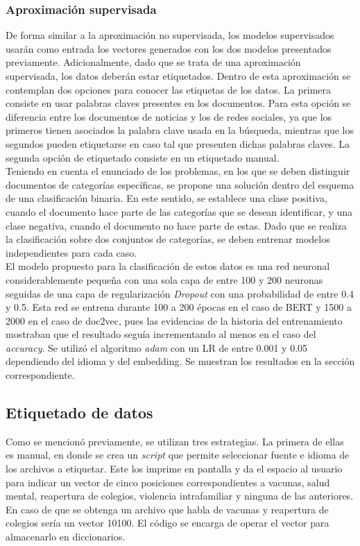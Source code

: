 \subsubsection{Aproximación supervisada}
De forma similar a la aproximación no supervisada, los modelos supervisados usarán como entrada los vectores generados con los dos modelos presentados previamente. Adicionalmente, dado que se trata de una aproximación supervisada, los datos deberán estar etiquetados. Dentro de esta aproximación se contemplan dos opciones para conocer las etiquetas de los datos. La primera consiste en usar palabras claves presentes en los documentos. Para esta opción se diferencia entre los documentos de noticias y los de redes sociales, ya que los primeros tienen asociados la palabra clave usada en la búsqueda, mientras que los segundos pueden etiquetarse en caso tal que presenten dichas palabras claves. La segunda opción de etiquetado consiste en un etiquetado manual.\\

Teniendo en cuenta el enunciado de los problemas, en los que se deben distinguir documentos de categorías específicas, se propone una solución dentro del esquema de una clasificación binaria. En este sentido, se establece una clase positiva, cuando el documento hace parte de las categorías que se desean identificar, y una clase negativa, cuando el documento no hace parte de estas. Dado que se realiza la clasificación sobre dos conjuntos de categorías, se deben entrenar modelos independientes para cada caso.\\

El modelo propuesto para la clasificación de estos datos es una red neuronal considerablemente pequeña con una sola capa de entre 100 y 200 neuronas seguidas de una capa de regularización \textit{Dropout} con una probabilidad de entre 0.4 y 0.5. Esta red se entrena durante 100 a 200 épocas en el caso de BERT y 1500 a 2000 en el caso de doc2vec, pues las evidencias de la historia del entrenamiento mostraban que el resultado seguía incrementando al menos en el caso del \textit{accuracy}. Se utilizó el algoritmo \textit{adam} con un LR de entre 0.001 y 0.05 dependiendo del idioma y del embedding. Se muestran los resultados en la sección correspondiente.

\subsection{Etiquetado de datos}
Como se mencionó previamente, se utilizan tres estrategias. La primera de ellas es manual, en donde se crea un \textit{script} que permite seleccionar fuente e idioma de los archivos a etiquetar. Este los imprime en pantalla y da el espacio al usuario para indicar un vector de cinco posiciones correspondientes a vacunas, salud mental, reapertura de colegios, violencia intrafamiliar y ninguna de las anteriores. En caso de que se obtenga un archivo que habla de vacunas y reapertura de colegios sería un vector 10100. El código se encarga de operar el vector para almacenarlo en diccionarios.\\

